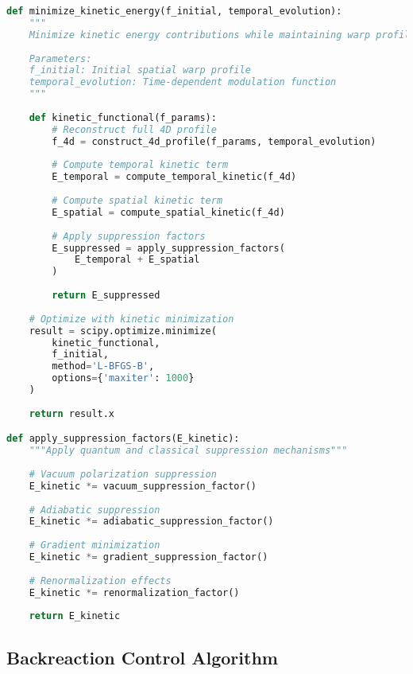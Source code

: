 \documentclass[12pt,a4paper]{article}
\begin{document}
\begin{lstlisting}[language=Python]
def minimize_kinetic_energy(f_initial, temporal_evolution):
    """
    Minimize kinetic energy contributions while maintaining warp profile
    
    Parameters:
    f_initial: Initial spatial warp profile
    temporal_evolution: Time-dependent modulation function
    """
    
    def kinetic_functional(f_params):
        # Reconstruct full 4D profile
        f_4d = construct_4d_profile(f_params, temporal_evolution)
        
        # Compute temporal kinetic term
        E_temporal = compute_temporal_kinetic(f_4d)
        
        # Compute spatial kinetic term
        E_spatial = compute_spatial_kinetic(f_4d)
        
        # Apply suppression factors
        E_suppressed = apply_suppression_factors(
            E_temporal + E_spatial
        )
        
        return E_suppressed
    
    # Optimize with kinetic minimization
    result = scipy.optimize.minimize(
        kinetic_functional,
        f_initial,
        method='L-BFGS-B',
        options={'maxiter': 1000}
    )
    
    return result.x

def apply_suppression_factors(E_kinetic):
    """Apply quantum and classical suppression mechanisms"""
    
    # Vacuum polarization suppression
    E_kinetic *= vacuum_suppression_factor()
    
    # Adiabatic suppression
    E_kinetic *= adiabatic_suppression_factor()
    
    # Gradient minimization
    E_kinetic *= gradient_suppression_factor()
    
    # Renormalization effects
    E_kinetic *= renormalization_factor()
    
    return E_kinetic
\end{lstlisting}

\subsection{Backreaction Control Algorithm}
\end{document}
